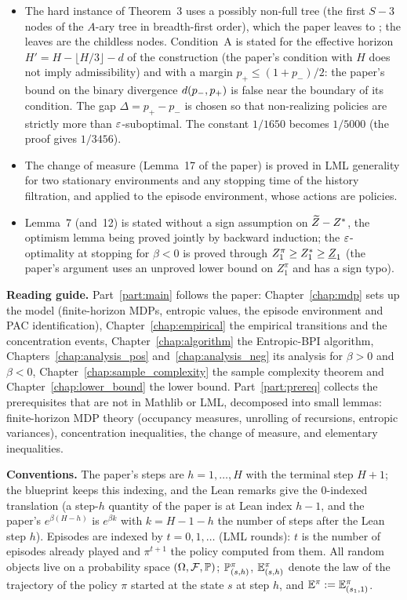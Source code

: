 \begin{itemize}
  \item The hard instance of Theorem~3 uses a possibly non-full tree (the first $S-3$ nodes of
        the $A$-ary tree in breadth-first order), which the paper leaves to
        \cite{domingues2021episodic}; the leaves are the childless nodes. Condition~A is
        stated for the effective horizon $H' = H - \lfloor H/3 \rfloor - d$ of the construction
        (the paper's condition with $H$ does not imply admissibility) and with a margin
        $p_+ \le (1 + p_-)/2$: the paper's bound on the binary divergence $d(p_-, p_+)$
        is false near the boundary of its condition. The gap $\Delta = p_+ - p_-$ is chosen so
        that non-realizing policies are strictly more than $\varepsilon$-suboptimal. The constant
        $1/1650$ becomes $1/5000$ (the proof gives $1/3456$).
  \item The change of measure (Lemma~17 of the paper) is proved in LML generality for two
        stationary environments and any stopping time of the history filtration, and applied
        to the episode environment, whose actions are policies.
  \item Lemma~7 (and~12) is stated without a sign assumption on $\widetilde{Z} - Z^*$, the optimism lemma
        being proved jointly by backward induction; the $\varepsilon$-optimality at stopping for
        $\beta < 0$ is proved through $Z^\pi_1 \ge Z^*_1 \ge \underline{Z}_1$ (the paper's argument uses
        an unproved lower bound on $Z^\pi_1$ and has a sign typo).
\end{itemize}

\textbf{Reading guide.}
Part~\ref{part:main} follows the paper: Chapter~\ref{chap:mdp} sets up the model (finite-horizon
MDPs, entropic values, the episode environment and PAC identification),
Chapter~\ref{chap:empirical} the empirical transitions and the concentration events,
Chapter~\ref{chap:algorithm} the Entropic-BPI algorithm, Chapters~\ref{chap:analysis_pos}
and~\ref{chap:analysis_neg} its analysis for $\beta > 0$ and $\beta < 0$,
Chapter~\ref{chap:sample_complexity} the sample complexity theorem and
Chapter~\ref{chap:lower_bound} the lower bound.
Part~\ref{part:prereq} collects the prerequisites that are not in Mathlib or LML, decomposed
into small lemmas: finite-horizon MDP theory (occupancy measures, unrolling of recursions,
entropic variances), concentration inequalities, the change of measure, and elementary
inequalities.

\textbf{Conventions.} The paper's steps are $h = 1, \dots, H$ with the terminal step $H + 1$;
the blueprint keeps this indexing, and the Lean remarks give the $0$-indexed translation
(a step-$h$ quantity of the paper is at Lean index $h - 1$, and the paper's
$e^{\beta(H - h)}$ is $e^{\beta k}$ with $k = H - 1 - h$ the number of steps after the Lean
step $h$). Episodes are indexed by $t = 0, 1, \dots$ (LML rounds): $t$ is the number of
episodes already played and $\pi^{t+1}$ the policy computed from them. All random objects live
on a probability space $(\Omega, \mathcal F, \mathbb{P})$; $\mathbb{P}^\pi_{(s,h)}$, $\mathbb{E}^\pi_{(s,h)}$ denote the
law of the trajectory of the policy $\pi$ started at the state $s$ at step $h$, and
$\mathbb{E}^\pi := \mathbb{E}^\pi_{(s_1, 1)}$.

